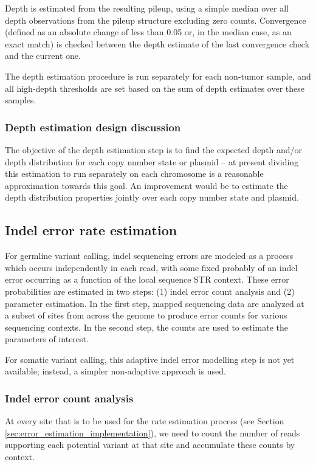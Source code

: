 \documentclass{article}
\begin{document}
Depth is estimated from the resulting pileup, using a simple median over all depth observations from the pileup structure excluding zero counts. Convergence (defined as an absolute change of less than 0.05 or, in the median case, as an exact match) is checked between the depth estimate of the last convergence check and the current one.

The depth estimation procedure is run separately for each non-tumor sample, and all high-depth thresholds are set based on the sum of depth estimates over these samples.


\subsubsection{Depth estimation design discussion}

The objective of the depth estimation step is to find the expected depth and/or depth distribution for each copy number state or plasmid -- at present dividing this estimation to run separately on each chromosome is a reasonable approximation towards this goal. An improvement would be to estimate the depth distribution properties jointly over each copy number state and plasmid.


\subsection{Indel error rate estimation}
\label{sec:indel_error_est}
For germline variant calling, indel sequencing errors are modeled as a process which occurs independently in each read, with some fixed probably of an indel error occurring as a function of the local sequence STR context. These error probabilities are estimated in two steps: (1) indel error count analysis and (2) parameter estimation. In the first step, mapped sequencing data are analyzed at a subset of sites from across the genome to produce error counts for various sequencing contexts. In the second step, the counts are used to estimate the parameters of interest.

For somatic variant calling, this adaptive indel error modelling step is not yet available; instead, a simpler non-adaptive approach is used.

\subsubsection{Indel error count analysis}
At every site that is to be used for the rate estimation process (see Section \ref{sec:error_estimation_implementation}), we need to count the number of reads supporting each potential variant at that site and accumulate these counts by context.
\end{document}

